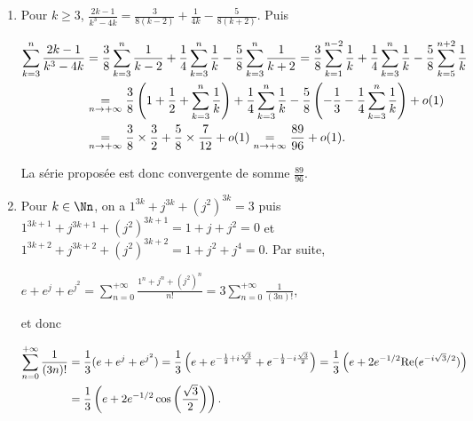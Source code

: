 {{\begin{enumerate}
Par suite, pour $n\in\Nn^*$ et $x\in\Rr\setminus\{1\}$

\begin{center}
$\sum_{k=0}^{n-1}(k+1)x^k=f_n'(x)=\left(\frac{x^n-1}{x-1}\right)'(x)=\frac{nx^{n-1}(x-1)-(x^n-1)}{(x-1)^2}=\frac{(n-1)x^n-nx^{n-1}+1}{(x-1)^2}$.
\end{center}

Pour $x=\frac{1}{3}$, on obtient  $\sum_{k=0}^{n-1}\frac{k+1}{3^k}=\frac{\frac{n-1}{3^n}-\frac{n}{3^{n-1}}+1}{\left(\frac{1}{3}-1\right)^2}$ et quand $n$ tend vers l'infini, on obtient de nouveau $S=\frac{9}{4}$.

\item  Pour $k\geqslant3$, $\frac{2k-1}{k^3-4k}=\frac{3}{8(k-2)}+\frac{1}{4k}-\frac{5}{8(k+2)}$. Puis

\begin{align*}\ensuremath
\sum_{k=3}^{n}\frac{2k-1}{k^3-4k}&=\frac{3}{8}\sum_{k=3}^{n}\frac{1}{k-2}+\frac{1}{4}\sum_{k=3}^{n}\frac{1}{k}-\frac{5}{8}\sum_{k=3}^{n}\frac{1}{k+2}=\frac{3}{8}\sum_{k=1}^{n-2}\frac{1}{k}+\frac{1}{4}\sum_{k=3}^{n}\frac{1}{k}-\frac{5}{8}\sum_{k=5}^{n+2}\frac{1}{k}\\
 &\underset{n\rightarrow+\infty}{=}\frac{3}{8}\left(1+\frac{1}{2}+\sum_{k=3}^{n}\frac{1}{k}\right)+\frac{1}{4}\sum_{k=3}^{n}\frac{1}{k}-\frac{5}{8}\left(-\frac{1}{3}-\frac{1}{4}\sum_{k=3}^{n}\frac{1}{k}\right)+o(1)\\
 &\underset{n\rightarrow+\infty}{=}\frac{3}{8}\times\frac{3}{2}+\frac{5}{8}\times\frac{7}{12}+o(1)\underset{n\rightarrow+\infty}{=}\frac{89}{96}+ o(1) .
\end{align*}

La série proposée est donc convergente de somme $\frac{89}{96}$.

\begin{center}
\end{center}

\item  Pour $k\in\Nn$, on a $1^{3k}+j^{3k}+(j^2)^{3k}=3$ puis $1^{3k+1}+j^{3k+1}+(j^2)^{3k+1} =1+j+j^2= 0$ et $1^{3k+2}+j^{3k+2}+(j^2)^{3k+2}=1+j^2 + j^4 = 0$. Par suite,

\begin{center}
$e+e^j+e^{j^2}=\sum_{n=0}^{+\infty}\frac{1^n+j^n+(j^2)^n}{n!}=3\sum_{n=0}^{+\infty}\frac{1}{(3n)!}$,
\end{center}

et donc

\begin{align*}\ensuremath
\sum_{n=0}^{+\infty}\frac{1}{(3n)!}&=\frac{1}{3}(e+e^j+e^{j^2})=\frac{1}{3}\left(e+e^{-\frac{1}{2}+i\frac{\sqrt{3}}{2}}+e^{-\frac{1}{2}-i\frac{\sqrt{3}}{2}}\right) =\frac{1}{3}\left(e + 2e^{-1/2}\text{Re}(e^{-i\sqrt{3}/2})\right)\\
 &=\frac{1}{3}\left(e +2e^{-1/2}\cos\left(\frac{\sqrt{3}}{2}\right)\right).
\end{align*}


\end{enumerate}}}
